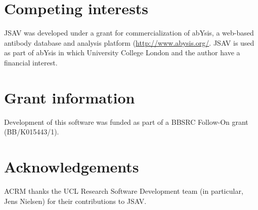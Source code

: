\documentclass[10pt,a4paper,twocolumn]{article}
\begin{document}
\section*{Competing interests}
JSAV was developed under a grant for commercialization of abYsis, a web-based antibody database and analysis platform (\url{http://www.abysis.org/}. JSAV is used as part of abYsis in which University College London and the author have a financial interest.

\section*{Grant information}
Development of this software was funded as part of a BBSRC Follow-On
grant (BB/K015443/1).

\section*{Acknowledgements}
ACRM thanks the UCL Research Software Development team (in particular,
Jens Nielsen) for their contributions to JSAV.


\end{document}

